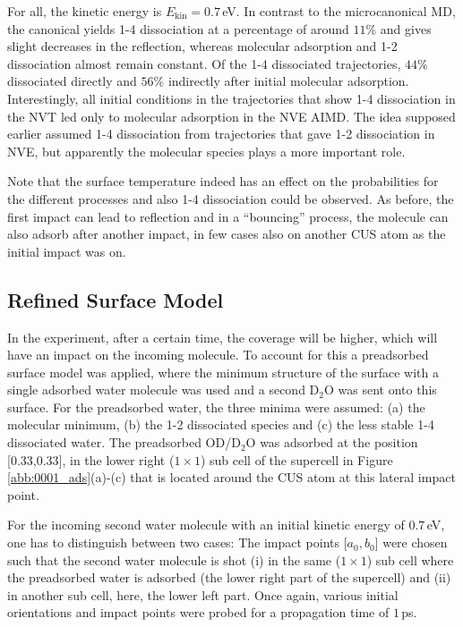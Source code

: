 \documentclass[11pt,DIV=13,BCOR=5mm,a4paper,headinclude]{scrbook}
\begin{document}
For all, the kinetic energy is $E_\textrm{kin}=0.7\,$eV.
In contrast to the microcanonical MD, the canonical yields 1-4 dissociation at a percentage of around $11\%$ and gives slight decreases in the reflection, whereas molecular adsorption and 1-2 dissociation almost remain constant.
Of the 1-4 dissociated trajectories, $44\%$ dissociated directly and $56\%$ indirectly after initial molecular adsorption.
Interestingly, all initial conditions in the trajectories that show 1-4 dissociation in the NVT led only to molecular adsorption in the NVE AIMD.
The idea supposed earlier assumed 1-4 dissociation from trajectories that gave 1-2 dissociation in NVE, but apparently the molecular species plays a more important role.


Note that the surface temperature indeed has an effect on the probabilities for the different processes and also 1-4 dissociation could be observed.
As before, the first impact can lead to reflection and in a ``bouncing'' process, the molecule can also adsorb after another impact, in few cases also on another CUS atom as the initial impact was on.
 
\subsection{Refined Surface Model}
In the experiment, after a certain time, the coverage will be higher, which will have an impact on the incoming molecule.
To account for this a preadsorbed surface model was applied, where the minimum structure of the surface with a single adsorbed water molecule was used and a second D$_2$O was sent onto this surface.
For the preadsorbed water, the three minima were assumed: (a) the molecular minimum, (b) the 1-2 dissociated species and (c) the less stable 1-4 dissociated water.
The preadsorbed OD/D$_2$O was adsorbed at the position [0.33,0.33], in the lower right ($1\times 1$) sub cell of the supercell in Figure \ref{abb:0001_ads}(a)-(c) that is located around the CUS atom at this lateral impact point.


For the incoming second water molecule with an initial kinetic energy of $0.7\,$eV, one has to distinguish between two cases:
The impact points [$a_0,b_0$] were chosen such that the second water molecule is shot (i) in the same ($1\times 1$) sub cell where the preadsorbed water is adsorbed (the lower right part of the supercell) and (ii) in another sub cell, here, the lower left part.
Once again, various initial orientations and impact points were probed for a propagation time of $1\,$ps.
\end{document}
